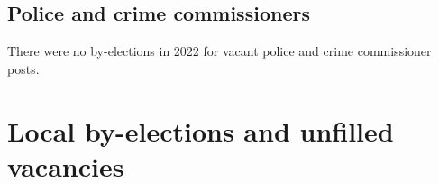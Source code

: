 \documentclass[a4paper,openany]{book}
\begin{document}
\section{Police and crime commissioners}

There were no by-elections in 2022 for vacant police and crime commissioner posts.

%
%
%
%

\chapter{Local by-elections and unfilled vacancies}
\end{document}
